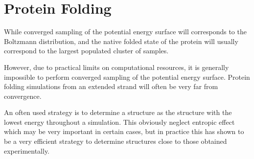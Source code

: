 \section{Protein Folding}
While converged sampling of the potential energy surface will corresponds to the Boltzmann distribution, and the native folded state of the protein will usually correspond to the largest populated cluster of samples.

However, due to practical limits on computational resources, it is generally impossible to perform converged sampling of the potential energy surface.
Protein folding simulations from an extended strand will often be very far from convergence.

An often used strategy is to determine a structure as the structure with the lowest energy throughout a simulation. This obviously neglect entropic effect which may be very important in certain cases, but in practice this has shown to be a very efficient strategy to determine structures close to those obtained experimentally.


